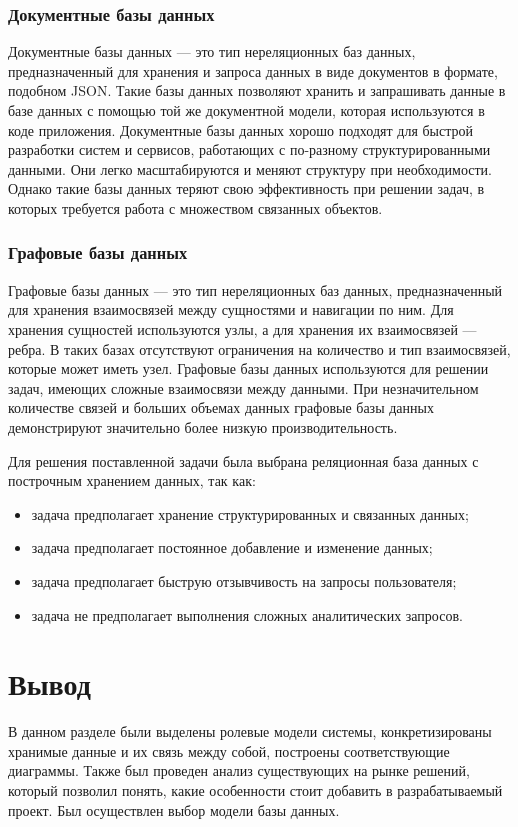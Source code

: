 \subsubsection{Документные базы данных}

Документные базы данных --- это тип нереляционных баз данных, предназначенный для хранения и запроса данных в виде документов в формате, подобном JSON. Такие базы данных позволяют хранить и запрашивать данные в базе данных с помощью той же документной модели, которая используются в коде приложения. Документные базы данных хорошо подходят для быстрой разработки систем и сервисов, работающих с по-разному структурированными данными. Они легко масштабируются и меняют структуру при необходимости. Однако такие базы данных теряют свою эффективность при решении задач, в которых требуется работа с множеством связанных объектов.

\subsubsection{Графовые базы данных}

Графовые базы данных --- это тип нереляционных баз данных, предназначенный для хранения взаимосвязей между сущностями и навигации по ним. Для хранения сущностей используются узлы, а для хранения их взаимосвязей --- ребра. В таких базах отсутствуют ограничения на количество и тип взаимосвязей, которые может иметь узел. Графовые базы данных используются для решении задач, имеющих сложные взаимосвязи между данными. При незначительном количестве связей и больших объемах данных графовые базы данных демонстрируют значительно более низкую производительность.

Для решения поставленной задачи была выбрана реляционная база данных с построчным хранением данных, так как:

\begin{itemize}
    \item задача предполагает хранение структурированных и связанных данных;
    \item задача предполагает постоянное добавление и изменение данных;
    \item задача предполагает быструю отзывчивость на запросы пользователя;
    \item задача не предполагает выполнения сложных аналитических запросов.
\end{itemize}

\section*{Вывод}

В данном разделе были выделены ролевые модели системы, конкретизированы хранимые данные и их связь между собой, построены соответствующие диаграммы. Также был проведен анализ существующих на рынке решений, который позволил понять, какие особенности стоит добавить в разрабатываемый проект. Был осуществлен выбор модели базы данных.